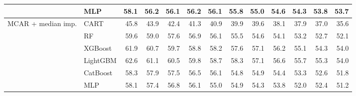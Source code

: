 \begin{table}[p]
\begin{tabular}{@{}llrrrrrrrrrrr@{}}
 & MLP & 58.1 & 56.2 & 56.1 & 56.2 & 56.1 & 55.8 & 55.0 & 54.6 & 54.3 & 53.8 & 53.7 \\
\midrule
MCAR + median imp. & CART & 45.8 & 43.9 & 42.4 & 41.3 & 40.9 & 39.9 & 39.6 & 38.1 & 37.9 & 37.0 & 35.6 \\
 & RF & 59.6 & 59.0 & 57.6 & 56.9 & 56.1 & 55.5 & 54.6 & 54.1 & 53.2 & 52.7 & 52.1 \\
 & XGBoost & 61.9 & 60.7 & 59.7 & 58.8 & 58.2 & 57.6 & 57.1 & 56.2 & 55.1 & 54.3 & 54.0 \\
 & LightGBM & 62.6 & 61.1 & 60.5 & 59.8 & 58.7 & 58.3 & 57.1 & 56.6 & 55.7 & 55.3 & 54.0 \\
 & CatBoost & 58.3 & 57.9 & 57.5 & 56.5 & 56.1 & 54.8 & 54.9 & 54.4 & 53.3 & 52.6 & 51.8 \\
 & MLP & 58.1 & 57.4 & 56.8 & 56.1 & 55.0 & 54.9 & 54.3 & 53.8 & 52.0 & 52.4 & 51.2 \\
\bottomrule
\end{tabular}
\end{table}
